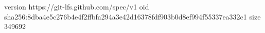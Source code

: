 version https://git-lfs.github.com/spec/v1
oid sha256:8dba4e5c276b4e4f2ffbfa294a3e42d16378fdf903b0d8ef994f55337ea332c1
size 349692
